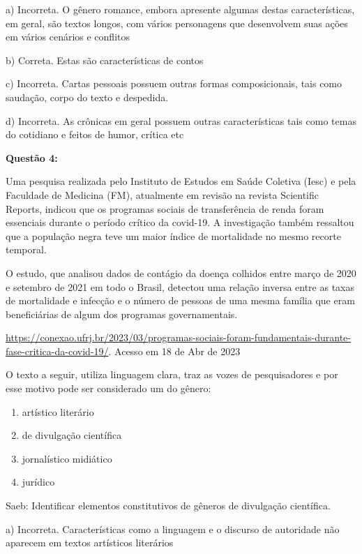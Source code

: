 a) Incorreta. O gênero romance, embora apresente algumas destas
características, em geral, são textos longos, com vários personagens que
desenvolvem suas ações em vários cenários e conflitos

b) Correta. Estas são características de contos

c) Incorreta. Cartas pessoais possuem outras formas composicionais, tais
como saudação, corpo do texto e despedida.

d) Incorreta. As crônicas em geral possuem outras características tais
como temas do cotidiano e feitos de humor, crítica etc

\textbf{Questão 4:}

Uma pesquisa realizada pelo Instituto de Estudos em Saúde Coletiva
(Iesc) e pela Faculdade de Medicina (FM), atualmente em revisão na
revista Scientific Reports, indicou que os programas sociais de
transferência de renda foram essenciais durante o período crítico da
covid-19. A investigação também ressaltou que a população negra teve um
maior índice de mortalidade no mesmo recorte temporal.

O estudo, que analisou dados de contágio da doença colhidos entre março
de 2020 e setembro de 2021 em todo o Brasil, detectou uma relação
inversa entre as taxas de mortalidade e infecção e o número de pessoas
de uma mesma família que eram beneficiárias de algum dos programas
governamentais.

\href{https://conexao.ufrj.br/2023/03/programas-sociais-foram-fundamentais-durante-fase-critica-da-covid-19/}{{https://conexao.ufrj.br/2023/03/programas-sociais-foram-fundamentais-durante-fase-critica-da-covid-19/}}.
Acesso em 18 de Abr de 2023

O texto a seguir, utiliza linguagem clara, traz as vozes de
pesquisadores e por esse motivo pode ser considerado um do gênero:

\begin{enumerate}
\def\labelenumi{\alph{enumi})}
\item
  artístico literário
\item
  de divulgação científica
\item
  jornalístico midiático
\item
  jurídico
\end{enumerate}

Saeb: Identificar elementos constitutivos de gêneros de divulgação
científica.

a) Incorreta. Características como a linguagem e o discurso de
autoridade não aparecem em textos artísticos literários

